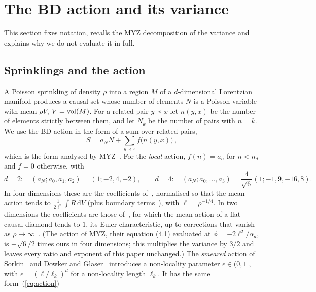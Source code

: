 \documentclass{iopjournal}
\newcommand{\eref}[1]{(\ref{#1})}
\newcommand{\rmd}{\mathrm{d}}
\newcommand{\rhoV}{\rho V}
\begin{document}
\section{The BD action and its variance}
\label{sec:setup}

This section fixes notation, recalls the MYZ decomposition of the variance
and explains why we do not evaluate it in full.

\subsection{Sprinklings and the action}

A Poisson sprinkling of density $\rho$ into a region $M$ of a $d$-dimensional
Lorentzian manifold produces a causal set whose number of elements $N$ is a
Poisson variable with mean $\rhoV$, $V={\rm vol}(M)$. For a related pair
$y\prec x$ let $n(y,x)$ be the number of elements strictly between them, and
let $N_k$ be the number of pairs with $n=k$. We use the BD action in the form
of a sum over related pairs,
\begin{equation}
S=a_N N+\sum_{y\prec x} f\big(n(y,x)\big)\,,
\label{eq:action}
\end{equation}
which is the form analysed by MYZ~\cite{Moradi2025}. For the \emph{local}
action, $f(n)=a_n$ for $n<n_d$ and $f=0$ otherwise, with
\begin{equation}
d=2:\quad (a_N;a_0,a_1,a_2)=(1;-2,4,-2),\qquad
d=4:\quad (a_N;a_0,\dots,a_3)=\frac{4}{\sqrt6}(1;-1,9,-16,8).
\label{eq:coeffs}
\end{equation}
In four dimensions these are the coefficients of~\cite{Benincasa2010}, normalised
so that the mean action tends to $\frac{1}{2\ell^2}\int R\,\rmd V$ (plus
boundary terms~\cite{Buck2015,Dowker2025,Machet2021}), with $\ell=\rho^{-1/4}$.
In two dimensions the coefficients are those of~\cite{Benincasa2011}, for
which the mean action of a flat causal diamond tends to $1$, its Euler
characteristic, up to corrections that vanish as
$\rho\to\infty$~\cite{Benincasa2011}. (The action of MYZ, their equation (4.1)
evaluated at $\phi=-2\ell^2/\alpha_d$, is $-\sqrt6/2$ times ours in four
dimensions; this multiplies the variance by $3/2$ and leaves every ratio and
exponent of this paper unchanged.) The \emph{smeared} action of
Sorkin~\cite{Sorkin2007} and Dowker and Glaser~\cite{Dowker2013,Glaser2014} introduces a
non-locality parameter $\epsilon\in(0,1]$, with $\epsilon=(\ell/\ell_k)^d$
for a non-locality length $\ell_k$. It has the same form~\eref{eq:action}
\end{document}
